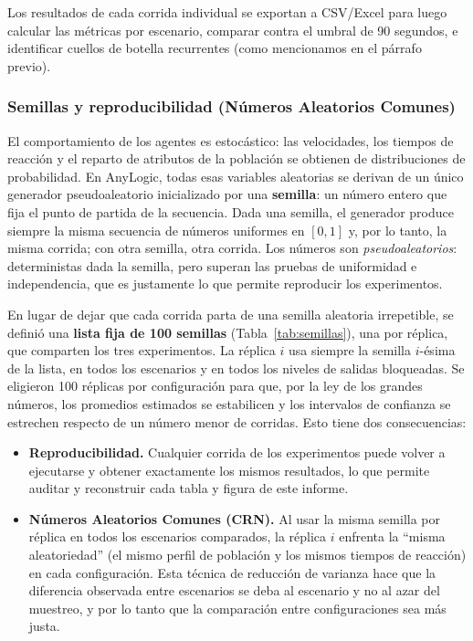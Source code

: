 \documentclass[a4paper, 11pt]{article}
\begin{document}
Los resultados de cada corrida individual se exportan a CSV/Excel para luego
calcular las m\'etricas por escenario, comparar contra el umbral de 90 segundos, e
identificar cuellos de botella recurrentes (como mencionamos en el p\'arrafo
previo).

\subsubsection{Semillas y reproducibilidad (N\'umeros Aleatorios Comunes)}\label{sub:semillas}

El comportamiento de los agentes es estoc\'astico: las velocidades, los tiempos de
reacci\'on y el reparto de atributos de la poblaci\'on se obtienen de distribuciones
de probabilidad. En AnyLogic, todas esas variables aleatorias se derivan de un
\'unico generador pseudoaleatorio inicializado por una \textbf{semilla}: un n\'umero
entero que fija el punto de partida de la secuencia. Dada una semilla, el generador
produce siempre la misma secuencia de n\'umeros uniformes en $[0,1]$ y, por lo tanto,
la misma corrida; con otra semilla, otra corrida. Los n\'umeros son
\textit{pseudoaleatorios}: deterministas dada la semilla, pero superan las pruebas de
uniformidad e independencia, que es justamente lo que permite reproducir los
experimentos.

En lugar de dejar que cada corrida parta de una semilla aleatoria irrepetible, se
defini\'o una \textbf{lista fija de 100 semillas} (Tabla~\ref{tab:semillas}), una por
r\'eplica, que comparten los tres experimentos. La r\'eplica $i$ usa siempre la
semilla $i$-\'esima de la lista, en todos los escenarios y en todos los niveles de
salidas bloqueadas. Se eligieron 100 r\'eplicas por configuraci\'on para que, por la
ley de los grandes n\'umeros, los promedios estimados se estabilicen y los intervalos
de confianza se estrechen respecto de un n\'umero menor de corridas. Esto tiene dos
consecuencias:

\begin{itemize}[leftmargin=2em]
    \item \textbf{Reproducibilidad.} Cualquier corrida de los experimentos puede
          volver a ejecutarse y obtener exactamente los mismos resultados, lo que
          permite auditar y reconstruir cada tabla y figura de este informe.
    \item \textbf{N\'umeros Aleatorios Comunes (CRN).} Al usar la misma semilla por
          r\'eplica en todos los escenarios comparados, la r\'eplica $i$ enfrenta la
          ``misma aleatoriedad'' (el mismo perfil de poblaci\'on y los mismos tiempos
          de reacci\'on) en cada configuraci\'on. Esta t\'ecnica de reducci\'on de
          varianza hace que la diferencia observada entre escenarios se deba al
          escenario y no al azar del muestreo, y por lo tanto que la comparaci\'on
          entre configuraciones sea m\'as justa.
\end{itemize}
\end{document}
